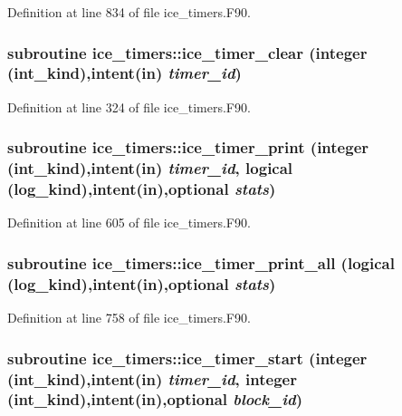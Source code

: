 Definition at line 834 of file ice\_\-timers.F90.\hypertarget{namespaceice__timers_a888b240d9ec89cc7a91d2cb25b59f4e0}{
\subsubsection[{ice\_\-timer\_\-clear}]{\setlength{\rightskip}{0pt plus 5cm}subroutine ice\_\-timers::ice\_\-timer\_\-clear (integer (int\_\-kind),intent(in) {\em timer\_\-id})}}
\label{namespaceice__timers_a888b240d9ec89cc7a91d2cb25b59f4e0}


Definition at line 324 of file ice\_\-timers.F90.\hypertarget{namespaceice__timers_a8b8114bad0fd653247cdc104256c83ab}{
\subsubsection[{ice\_\-timer\_\-print}]{\setlength{\rightskip}{0pt plus 5cm}subroutine ice\_\-timers::ice\_\-timer\_\-print (integer (int\_\-kind),intent(in) {\em timer\_\-id}, \/  logical (log\_\-kind),intent(in),optional {\em stats})}}
\label{namespaceice__timers_a8b8114bad0fd653247cdc104256c83ab}


Definition at line 605 of file ice\_\-timers.F90.\hypertarget{namespaceice__timers_ace88d185debbc44901eff5a1d54d7fde}{
\subsubsection[{ice\_\-timer\_\-print\_\-all}]{\setlength{\rightskip}{0pt plus 5cm}subroutine ice\_\-timers::ice\_\-timer\_\-print\_\-all (logical (log\_\-kind),intent(in),optional {\em stats})}}
\label{namespaceice__timers_ace88d185debbc44901eff5a1d54d7fde}


Definition at line 758 of file ice\_\-timers.F90.\hypertarget{namespaceice__timers_a308c3af934358cb1f050df7cce19ce79}{
\subsubsection[{ice\_\-timer\_\-start}]{\setlength{\rightskip}{0pt plus 5cm}subroutine ice\_\-timers::ice\_\-timer\_\-start (integer (int\_\-kind),intent(in) {\em timer\_\-id}, \/  integer (int\_\-kind),intent(in),optional {\em block\_\-id})}}
\label{namespaceice__timers_a308c3af934358cb1f050df7cce19ce79}


